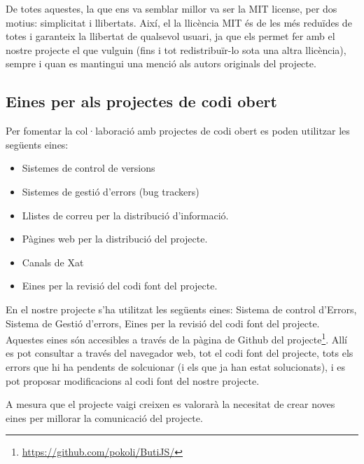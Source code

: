De totes aquestes, la que ens va semblar millor va ser la MIT license, per dos motius: simplicitat i llibertats. Així, el la llicència MIT és de les més reduïdes de totes i garanteix la llibertat de qualsevol usuari, ja que els permet fer amb el nostre projecte el que vulguin (fins i tot redistribuïr-lo sota una altra llicència), sempre i quan es mantingui una menció als autors originals del projecte. 

\subsection{Eines per als projectes de codi obert}

Per fomentar la col·laboració amb projectes de codi obert es poden utilitzar les següents eines: 

\begin{itemize}
\item{Sistemes de control de versions}
\item{Sistemes de gestió d'errors (bug trackers)}
\item{Llistes de correu per la distribució d'informació.}
\item{Pàgines web per la distribució del projecte.}
\item{Canals de Xat}
\item{Eines per la revisió del codi font del projecte.}
\end{itemize}

En el nostre projecte s'ha utilitzat les següents eines: Sistema de control d'Errors, Sistema de Gestió d'errors, Eines per la revisió del codi font del projecte. Aquestes eines són accesibles a través de la pàgina de Github del projecte\footnote{\url{https://github.com/pokoli/ButiJS/}}. Allí es pot consultar a través del navegador web, tot el codi font del projecte, tots els errors que hi ha pendents de solcuionar (i els que ja han estat solucionats), i es pot proposar modificacions al codi font del nostre projecte. 

A mesura que el projecte vaigi creixen es valorarà la necesitat de crear noves eines per millorar la comunicació del projecte. 

